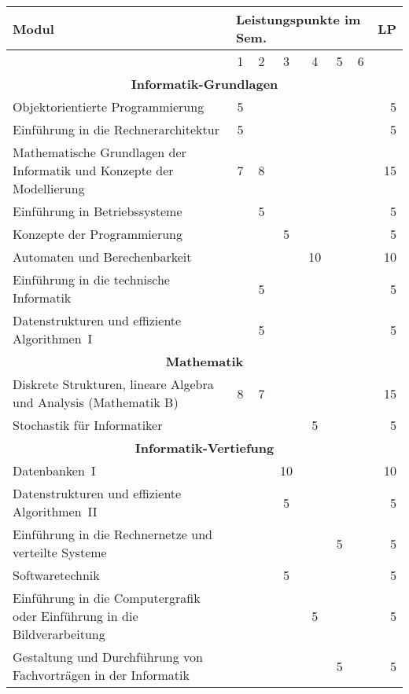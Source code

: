 \begin{table}[btp]
    \begin{small}
    \begin{tabularx}{\textwidth}{|X||c|c|c|c|c|c||r|}
        \hline
        \textbf{Modul}&\multicolumn{6}{l||}{\textbf{Leistungspunkte im Sem.}}&\textbf{LP}\\\hline
        &1&2&3&4&5&6&\\\hline\hline
        \multicolumn{8}{|c|}{\textbf{Informatik-Grundlagen}}\\\hline
        Objektorientierte Programmierung&5&&&&&&5\\\hline
        Einführung in die Rechnerarchitektur&5&&&&&&5\\\hline
        Mathematische Grundlagen der Informatik und Konzepte der Modellierung &7&8&&&&&15\\\hline
        Einführung in Betriebssysteme&&5&&&&&5\\\hline
        Konzepte der Programmierung&&&5&&&&5\\\hline
        Automaten und Berechenbarkeit&&&&10&&&10\\\hline
        Einführung in die technische Informatik&&5&&&&&5\\\hline
        Datenstrukturen und effiziente Algorithmen~I&&5&&&&&5\\\hline\hline
        \multicolumn{8}{|c|}{\textbf{Mathematik}}\\\hline
        Diskrete Strukturen, lineare Algebra und Analysis (Mathematik B)&8&7&&&&&15\\\hline
        Stochastik für Informatiker&&&&5&&&5\\\hline\hline
        \multicolumn{8}{|c|}{\textbf{Informatik-Vertiefung}}\\\hline
        Datenbanken~I&&&10&&&&10\\\hline
        Datenstrukturen und effiziente Algorithmen~II&&&5&&&&5\\\hline
        Einführung in die Rechnernetze und verteilte Systeme&&&&&5&&5\\\hline
        Softwaretechnik&&&5&&&&5\\\hline
        Einführung in die Computergrafik oder Einführung in die Bildverarbeitung&&&&5&&&5\\\hline
        Gestaltung und Durchführung von Fachvorträgen in der Informatik&&&&&5&&5\\\hline

\end{tabularx}
\end{small}
\end{table}
